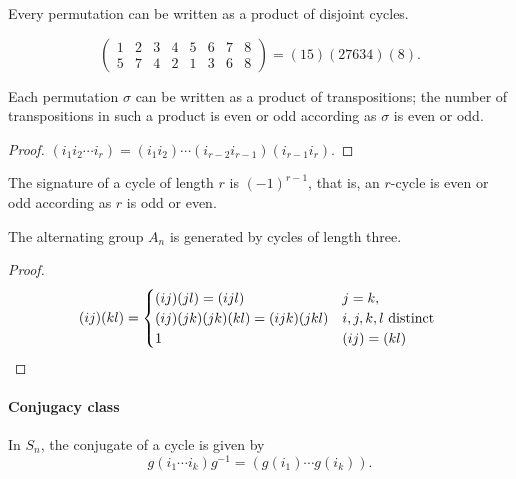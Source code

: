 \begin{proposition}
  Every permutation can be written as a product of disjoint cycles.
\end{proposition}
\begin{example}
  \[
    \begin{pmatrix}
    1 & 2 & 3 & 4 & 5 & 6 & 7 & 8\\
    5 & 7 & 4 & 2 & 1 & 3 & 6 & 8
    \end{pmatrix} = (15)(27634)(8).
  \]
\end{example}

\begin{corollary}
  Each permutation \( \sigma \) can be written as a product of transpositions;
  the number of transpositions in such a product is even or odd according as \( \sigma \) is even or odd.
\end{corollary}
\begin{proof}
  \( (i_1 i_2 \cdots i_r) = (i_1 i_2) \cdots (i_{r - 2}i_{r - 1})(i_{r - 1} i_r) \).
\end{proof}
\begin{remark}
  The signature of a cycle of length \( r \) is \( (-1)^{r - 1} \), that is, an \( r \)-cycle is even or odd according as \( r \) is odd or even.
\end{remark}

\begin{corollary}
  The alternating group \( A_n \) is generated by cycles of length three.
\end{corollary}
\begin{proof}
  \[
    (ij)(kl) = \begin{cases}
      (ij) (jl) = (ijl) & j = k,\\
      (ij)(jk)(jk)(kl) = (ijk)(jkl) & i,j,k,l \textmd{ distinct }\\
      1 & (ij) = (kl)
    \end{cases}
  \]
\end{proof}

\paragraph{Conjugacy class}

\begin{example}
  In \( S_n \), the conjugate of a cycle is given by
  \[
    g(i_1 \cdots i_k)g^{-1} = (g(i_1) \cdots g(i_k)).
  \]
\end{example}

